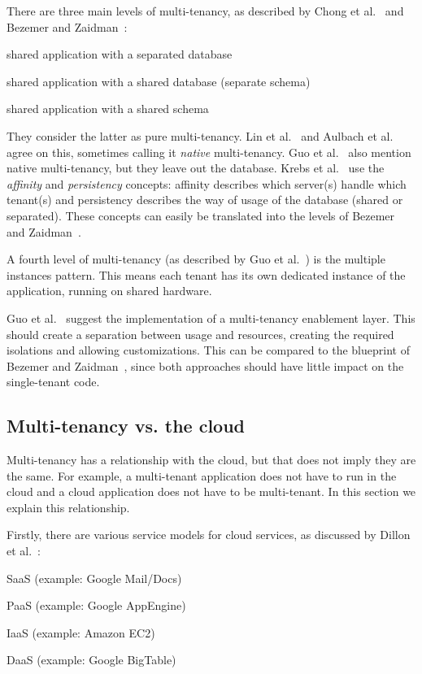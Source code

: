 There are three main levels of multi-tenancy, as described by Chong et al.~\cite{chong2006multi} and Bezemer and Zaidman~\cite{bezemer2010multi}:
\begin{compactenum}
\item shared application with a separated database
\item shared application with a shared database (separate schema)
\item shared application with a shared schema
\end{compactenum}
They consider the latter as pure multi-tenancy. Lin et al.~\cite{lin2009feedback} and Aulbach et al.~\cite{aulbach2009comparison} agree on this, sometimes calling it \emph{native} multi-tenancy. Guo et al.~\cite{guo2007framework} also mention native multi-tenancy, but they leave out the database. Krebs et al.~\cite{krebs2012architecture} use the \emph{affinity} and \emph{persistency} concepts: affinity describes which server(s) handle which tenant(s) and persistency describes the way of usage of the database (shared or separated). These concepts can easily be translated into the levels of Bezemer and Zaidman~\cite{bezemer2010multi}. 

A fourth level of multi-tenancy (as described by Guo et al.~\cite{guo2007framework}) is the multiple instances pattern. This means each tenant has its own dedicated instance of the application, running on shared hardware.

Guo et al.~\cite{guo2007framework} suggest the implementation of a multi-tenancy enablement layer. This should create a separation between usage and resources, creating the required isolations and allowing customizations. This can be compared to the blueprint of Bezemer and Zaidman~\cite{bezemer2010multi}, since both approaches should have little impact on the single-tenant code.

\subsection{Multi-tenancy vs. the cloud}

Multi-tenancy has a relationship with the cloud, but that does not imply they are the same. For example, a multi-tenant application does not have to run in the cloud and a cloud application does not have to be multi-tenant. In this section we explain this relationship.

Firstly, there are various service models for cloud services, as discussed by Dillon et al.~\cite{dillon2010cloud}:
\begin{compactenum}
\item \acf{SaaS} (example: Google Mail/Docs)
\item \acf{PaaS} (example: Google AppEngine)
\item \acf{IaaS} (example: Amazon EC2)
\item \acf{DaaS} (example: Google BigTable)
\end{compactenum}

